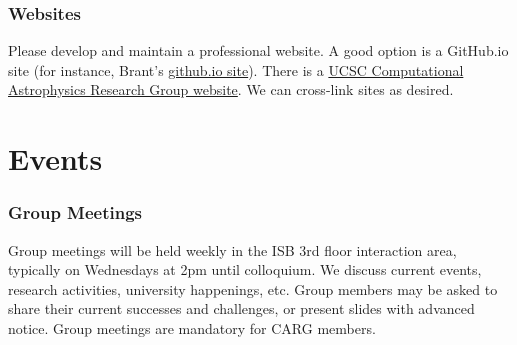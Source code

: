 \documentclass[fleqn,10pt]{wlscirep}
\begin{document}
\subsubsection{Websites}
Please develop and maintain a
professional website. A good
option is a GitHub.io site (for
instance, Brant's \href{http://brantr.github.io}{github.io site}).
There is a 
\href{http://robertson.sites.ucsc.edu}{UCSC Computational Astrophysics Research Group website}. We can
cross-link sites as desired.







\newpage
\section{Events}
\label{sec:events}

\subsubsection{Group Meetings}
\label{sec:group_meetings}
Group meetings will be held
weekly
in the ISB 3rd floor interaction
area, typically on Wednesdays
at 2pm until colloquium.
We discuss current events,
research activities, university
happenings, etc. Group members
may be asked to share their
current successes and challenges,
or present slides with advanced
notice.
Group meetings are mandatory
for CARG members.
\end{document}
